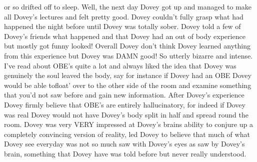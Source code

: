 \documentclass[12pt]{book}
\begin{document}
or so drifted off to sleep. Well, the next day Dovey got up and managed to make all Dovey's lectures and felt pretty good. Dovey couldn't fully grasp what had happened the night before until Dovey was totally sober. Dovey told a few of Dovey's friends what happened and that Dovey had an out of body experience but mostly got funny looked! Overall Dovey don't think Dovey learned anything from this experience but Dovey was DAMN good! So utterly bizarre and intense. I've read about OBE's quite a lot and always liked the idea that Dovey was genuinely the soul leaved the body, say for instance if Dovey had an OBE Dovey would be able tofloat' over to the other side of the room and examine something that you'd not saw before and gain new information. After Dovey's experience Dovey firmly believe that OBE's are entirely hallucinatory, for indeed if Dovey was real Dovey would not have Dovey's body split in half and spread round the room. Dovey was very VERY impressed at Dovey's brains ability to conjure up a completely convincing version of reality, led Dovey to believe that much of what Dovey see everyday was not so much saw with Dovey's eyes as saw by Dovey's brain, something that Dovey have was told before but never really understood.
\end{document}
